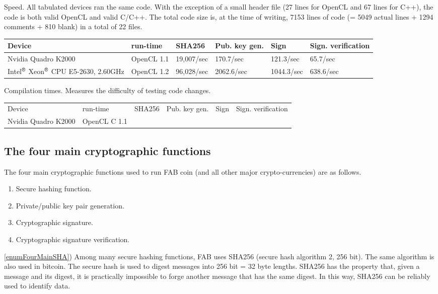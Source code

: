 \documentclass{article}
\begin{document}
Speed. All tabulated devices ran the same code. With the exception of a small header file (27 lines for OpenCL and 67 lines for C++), the code is both valid OpenCL and valid C/C++. The total code size is, at the time of writing, 7153 lines of code (= 5049 actual lines + 1294 comments + 810 blank) in a total of 22 files.

\begin{tabular}{|l|l|l|l|l|l|}\hline
Device & run-time & SHA256 & Pub. key gen. & Sign & Sign. verification\\\hline
Nvidia Quadro K2000 & OpenCL 1.1 &19,007/sec & 170.7/sec & 121.3/sec & 65.7/sec\\\hline
Intel${}^{\text{\sffamily\textregistered}}$ Xeon${}^{\text{\sffamily\textregistered}}$ CPU E5-2630, 2.60GHz& OpenCL 1.2 &96,028/sec & 2062.6/sec& 1044.3/sec & 638.6/sec\\\hline
\end{tabular}

Compilation times. Measures the difficulty of testing code changes.

\begin{tabular}{llllll}
	Device & run-time & SHA256 & Pub. key gen. & Sign & Sign. verification\\
	Nvidia Quadro K2000 & OpenCL C 1.1 & &
\end{tabular}


\subsection{The four main cryptographic functions} \label{sectionFourMainCrypto}
The four main cryptographic functions used to run FAB coin (and all other major crypto-currencies) are as follows.
\begin{enumerate}
\item \label{enumFourMainSHA} Secure hashing function.
\item \label{enumFourMainPrivatePublicKeyGeneration} Private/public key pair generation.
\item \label{enumFourMainCryptoSignature} Cryptographic signature.
\item \label{enumFourMainVerification} Cryptographic signature verification.
\end{enumerate}

\noindent\ref{enumFourMainSHA}) Among many secure hashing functions, FAB uses SHA256 (secure hash algorithm 2, 256 bit). The same algorithm is also used in bitcoin. The secure hash is used to digest messages into 256 bit = 32 byte lengths. SHA256 has the property that, given a message and its digest, it is practically impossible to forge another message that has the same digest. 
In this way, SHA256 can be reliably used to identify data. 
\end{document}
